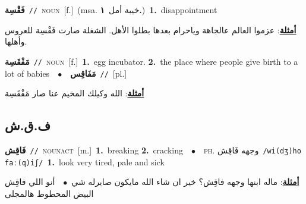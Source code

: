 \documentclass[10pt,a4paper,twoside]{article} %
\begin{document}
\begin{multicols}{2}
{\setlength\topsep{0pt}\textbf{\foreignlanguage{arabic}{فَقْسِة}}\ {\color{gray}\texttt{//}\color{black}}\ \textsc{noun}\ [f.]\ \color{gray}(msa. \foreignlanguage{arabic}{خيبة أمل}~\foreignlanguage{arabic}{\textbf{١.}})\color{black}\ \textbf{1.}~disappointment\  \begin{flushright}\color{gray}\foreignlanguage{arabic}{\textbf{\underline{\foreignlanguage{arabic}{أمثلة}}}: عزموا العالم عالجاهة وياحرام بعدها بطلوا الأهل. الشغلة صارت فَقْسِة للعروس وأهلها.}\end{flushright}\color{black}} \vspace{2mm}

{\setlength\topsep{0pt}\textbf{\foreignlanguage{arabic}{مَفْقَسِة}}\ {\color{gray}\texttt{//}\color{black}}\ \textsc{noun}\ [f.]\ \textbf{1.}~egg incubator.  \textbf{2.}~the place where people give birth to a lot of babies\ \ $\bullet$\ \ \setlength\topsep{0pt}\textbf{\foreignlanguage{arabic}{مَفَاقِس}}\ {\color{gray}\texttt{//}\color{black}}\ [pl.]\  \begin{flushright}\color{gray}\foreignlanguage{arabic}{\textbf{\underline{\foreignlanguage{arabic}{أمثلة}}}: الله وكيلك المخيم عنا صار مَفْقَسِة}\end{flushright}\color{black}} \vspace{2mm}

\vspace{-3mm}
\subsection*{\color{blue}\foreignlanguage{arabic}{ف.ق.ش}\color{blue}{}} 

{\setlength\topsep{0pt}\textbf{\foreignlanguage{arabic}{فَاقِش}}\ {\color{gray}\texttt{//}\color{black}}\ \textsc{noun\textunderscore act}\ [m.]\ \textbf{1.}~breaking  \textbf{2.}~cracking\ \ $\bullet$\ \ \textsc{ph.} \color{gray} \foreignlanguage{arabic}{وجهه فَاقِش}\color{black}\ {\color{gray}\texttt{/{\sffamily wi(dʒ)ho faː(q)iʃ}/}\color{black}}\ \textbf{1.}~look very tired, pale and sick\  \begin{flushright}\color{gray}\foreignlanguage{arabic}{\textbf{\underline{\foreignlanguage{arabic}{أمثلة}}}: ماله ابنها وجهه فاقِش؟ خير ان شاء الله مايكون صايرله شي\ $\bullet$\ \  أنو اللي فاقِش البيض المحطوط هالمجلى}\end{flushright}\color{black}} \vspace{2mm}


\end{multicols}
\end{document}
